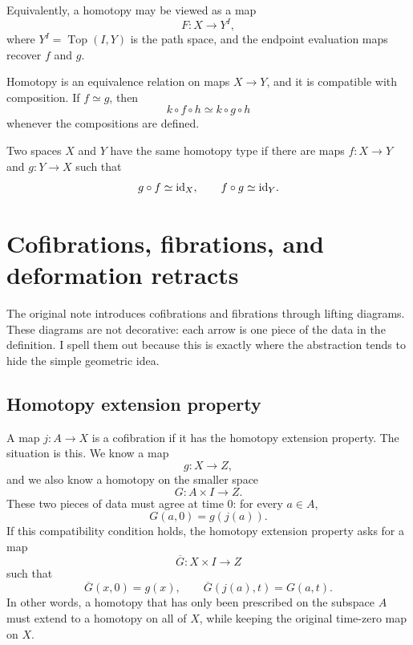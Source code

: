 Equivalently, a homotopy may be viewed as a map
\[
  F:X\to Y^I,
\]
where \(Y^I=\operatorname{Top}(I,Y)\) is the path space, and the endpoint evaluation maps recover \(f\) and \(g\).

\begin{proposition}
Homotopy is an equivalence relation on maps \(X\to Y\), and it is compatible with composition.  If \(f\simeq g\), then
\[
  k\circ f\circ h\simeq k\circ g\circ h
\]
whenever the compositions are defined.
\end{proposition}

\begin{definition}
Two spaces \(X\) and \(Y\) have the same homotopy type if there are maps \(f:X\to Y\) and \(g:Y\to X\) such that
\[
  g\circ f\simeq \mathrm{id}_X,\qquad f\circ g\simeq \mathrm{id}_Y.
\]
\end{definition}

\section{Cofibrations, fibrations, and deformation retracts}

The original note introduces cofibrations and fibrations through lifting diagrams.  These diagrams are not decorative: each arrow is one piece of the data in the definition.  I spell them out because this is exactly where the abstraction tends to hide the simple geometric idea.

\subsection{Homotopy extension property}

A map \(j:A\to X\) is a cofibration if it has the homotopy extension property.  The situation is this.  We know a map
\[
  g:X\to Z,
\]
and we also know a homotopy on the smaller space
\[
  G:A\times I\to Z.
\]
These two pieces of data must agree at time \(0\): for every \(a\in A\),
\[
  G(a,0)=g(j(a)).
\]
If this compatibility condition holds, the homotopy extension property asks for a map
\[
  \overline G:X\times I\to Z
\]
such that
\[
  \overline G(x,0)=g(x),
  \qquad
  \overline G(j(a),t)=G(a,t).
\]
In other words, a homotopy that has only been prescribed on the subspace \(A\) must extend to a homotopy on all of \(X\), while keeping the original time-zero map on \(X\).

